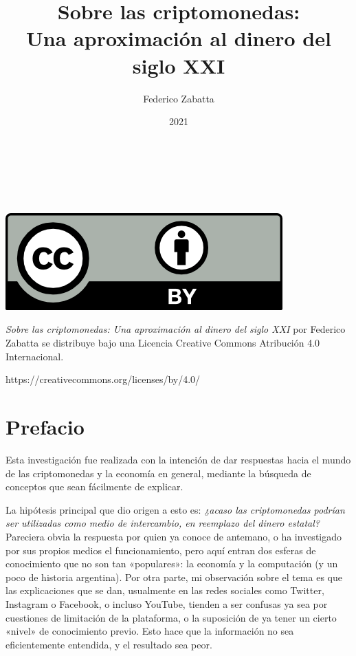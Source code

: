 \documentclass[12pt,a4paper,twoside]{book}
\author{Federico Zabatta}
\date{2021}
\title{\huge Sobre las criptomonedas: \\
	\large Una aproximación al dinero del siglo XXI \\}
\begin{document}
\setcounter{secnumdepth}{-1}

\maketitle
\newpage

\thispagestyle{empty}
\ %
\newpage

\ %

\vspace{12cm}

\includegraphics[scale=1]{img/licencia.png}

\vspace{0.5cm}

\textit{Sobre las criptomonedas: Una aproximación al dinero del siglo XXI} por Federico Zabatta se distribuye bajo una Licencia Creative Commons Atribución 4.0 Internacional.

https://creativecommons.org/licenses/by/4.0/

\newpage

\tableofcontents

\chapter{Prefacio}
Esta investigación fue realizada con la intención de dar respuestas hacia el mundo de las criptomonedas y la economía en general, mediante la búsqueda de conceptos que sean fácilmente de explicar.

La hipótesis principal que dio origen a esto es: \textit{¿acaso las criptomonedas podrían ser utilizadas como medio de intercambio, en reemplazo del dinero estatal?} Pareciera obvia la respuesta por quien ya conoce de antemano, o ha investigado por sus propios medios el funcionamiento, pero aquí entran dos esferas de conocimiento que no son tan «populares»: la economía y la computación (y un poco de historia argentina). Por otra parte, mi observación sobre el tema es que las explicaciones que se dan, usualmente en las redes sociales como Twitter, Instagram o Facebook, o incluso YouTube, tienden a ser confusas ya sea por cuestiones de limitación de la plataforma, o la suposición de ya tener un cierto «nivel» de conocimiento previo. Esto hace que la información no sea eficientemente entendida, y el resultado sea peor.
\end{document}

